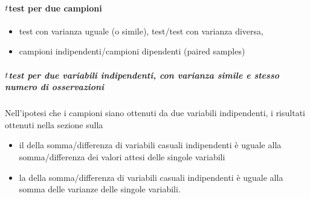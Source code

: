 \documentclass[letterpaper,10pt,italian]{jupyterBook}
\begin{document}
\paragraph{\protect\(t\protect\)\sphinxhyphen{}test per due campioni}
\label{\detokenize{ch/statistics/t-test:t-test-per-due-campioni}}\begin{itemize}
\item {} 
\sphinxAtStartPar
test con varianza uguale (o simile), \sphinxhyphen{}test/test con varianza diversa, 

\item {} 
\sphinxAtStartPar
campioni indipendenti/campioni dipendenti (paired samples)

\end{itemize}


\subparagraph{\protect\(t\protect\)\sphinxhyphen{}test per due variabili indipendenti, con varianza simile e stesso numero di osservazioni}
\label{\detokenize{ch/statistics/t-test:t-test-per-due-variabili-indipendenti-con-varianza-simile-e-stesso-numero-di-osservazioni}}
\sphinxAtStartPar
Nell’ipotesi che i campioni siano ottenuti da due variabili indipendenti, i risultati ottenuti nella sezione sulla {\hyperref[\detokenize{ch/statistics::doc}]{}}
\begin{itemize}
\item {} 
\sphinxAtStartPar
il  della somma/differenza di variabili casuali indipendenti è uguale alla somma/differenza dei valori attesi delle singole variabili

\item {} 
\sphinxAtStartPar
la  della somma/differenza di variabili casuali indipendenti è uguale alla somma delle varianze delle singole variabili.

\end{itemize}
\end{document}
